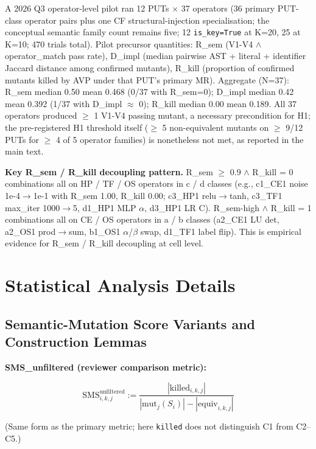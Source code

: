 \documentclass[manuscript,screen,review]{acmart}
\begin{document}
A 2026 Q3 operator-level pilot ran 12 PUTs $\times$ 37 operators (36
primary PUT-class operator pairs plus one CF structural-injection
specialisation; the conceptual semantic family count remains five; 12
\texttt{is\_key=True} at K=20, 25 at K=10; 470 trials total). Pilot
precursor quantities: R\_sem (V1-V4 $\wedge$ operator\_match pass rate),
D\_impl (median pairwise AST + literal + identifier Jaccard distance
among confirmed mutants), R\_kill (proportion of confirmed mutants
killed by AVP under that PUT's primary MR). Aggregate (N=37): R\_sem
median 0.50 mean 0.468 (0/37 with R\_sem=0); D\_impl median 0.42 mean
0.392 (1/37 with D\_impl $\approx$ 0); R\_kill median 0.00 mean 0.189. All 37
operators produced $\geq$ 1 V1-V4 passing mutant, a necessary
precondition for H1; the pre-registered H1 threshold itself ($\geq$ 5
non-equivalent mutants on $\geq$ 9/12 PUTs for $\geq$ 4 of 5 operator
families) is nonetheless not met, as reported in the main text.

\textbf{Key R\_sem / R\_kill decoupling pattern.} R\_sem $\geq$ 0.9 $\wedge$ R\_kill
= 0 combinations all on HP / TF / OS operators in c / d classes (e.g.,
c1\_CE1 noise 1e-4$\to$1e-1 with R\_sem 1.00, R\_kill 0.00; c3\_HP1
relu$\to$tanh, c3\_TF1 max\_iter 1000$\to$5, d1\_HP1 MLP $\alpha$, d3\_HP1 LR C).
R\_sem-high $\wedge$ R\_kill = 1 combinations all on CE / OS operators in a / b
classes (a2\_CE1 LU det, a2\_OS1 prod$\to$sum, b1\_OS1 $\alpha$/$\beta$ swap, d1\_TF1
label flip). This is empirical evidence for R\_sem / R\_kill decoupling at cell level.


\section{Statistical Analysis Details}\label{d.-statistical-analysis-details}

\subsection{Semantic-Mutation Score Variants and Construction Lemmas}\label{d.1-sms-variants-and-construction-lemmas}

\textbf{SMS\_unfiltered (reviewer comparison metric):}

\[
\mathrm{SMS}^{\mathrm{unfiltered}}_{i,k,j} := \frac{|\mathrm{killed}_{i,k,j}|}{|\mathrm{mut}_j(S_i)| - |\mathrm{equiv}_{i,k,j}|}
\]

(Same form as the primary metric; here \texttt{killed} does not distinguish C1 from C2--C5.)
\end{document}
